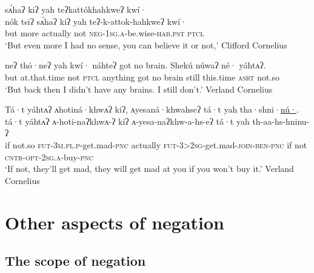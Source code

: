 \documentclass[output=paper,colorlinks,citecolor=brown]{langscibook}
\begin{document}
\begin{exe}
\ex\label{oneida:notso 1}	
    { sʌ́haʔ kiʔ yah	teʔkatt\'okhahkweʔ kwí· \\
    {n\'ok tsiʔ} sʌ́haʔ kiʔ yah	 teʔ-k-attok-hahkweʔ 	kwí·  \\
    but more actually not \textsc{neg-1sg.a}-be.wise-\textsc{hab.pst} \textsc{ptcl}  \\}
    \glt `But even more I had no sense, you can believe it or not,' Clifford Cornelius \citep[228 (74)]{MichelsonEtAl2016}
\end{exe}

\ea\label{oneida:notso 2}
      {neʔ th\'o·neʔ} yah kwí· náhteʔ got no brain. Shekú núwaʔ né· yáhtʌʔ. \\
    but {at.that.time} not \textsc{ptcl} anything got no brain still {this.time} \textsc{asrt} {not.so} \\
    \glt `But back then I didn't have any brains. I still don't.' Verland Cornelius \citep[320 (82--83)]{MichelsonEtAl2016}
\z

\ea\label{oneida:dependent}
    \glll Tá·t yáhtʌʔ ʌhotiná·khwʌʔ kiʔ, ʌyesaná·khwahseʔ tá·t yah tha·shni·\uline{nú·}. \\
    tá·t yáhtʌʔ ʌ-hoti-na{ʔ}khwʌ-ʔ kiʔ ʌ-yesa-naʔkhw-a-hs-eʔ tá·t yah th-aa-hs-hninu-ʔ \\
    if {not.so} \textsc{fut-3m.pl.p}-get.mad-\textsc{pnc} {actually} \textsc{fut-3>2sg}-get.mad-\textsc{join-ben-pnc} if not \textsc{cntr-opt-2sg.a}-buy-\textsc{pnc} \\
    \glt `If not, they'll get mad, they will get mad at you if you won't buy it.' Verland Cornelius \citep[326--327 (146)]{MichelsonEtAl2016}
\z

\section{Other aspects of negation}
\label{oneida:sec:other aspects}

\subsection{The scope of negation}
\label{oneida:sec:scope}
\end{document}
